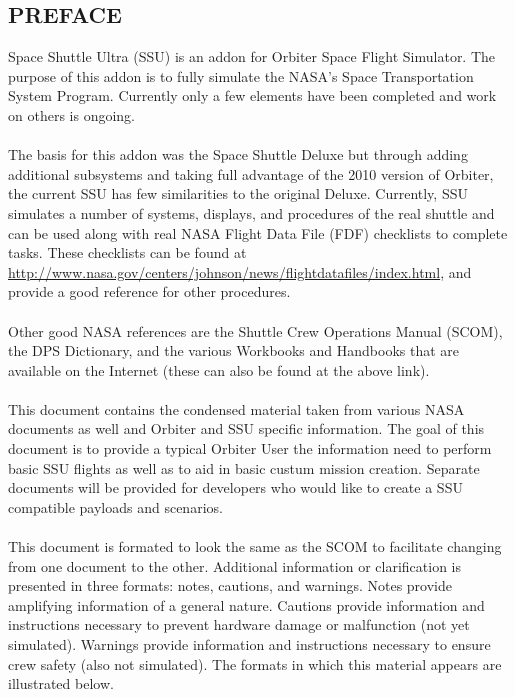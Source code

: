 \documentclass[13pt]{article}
\begin{document}
\begin{multicols}{2}
\section*{\large PREFACE}
Space Shuttle Ultra (SSU) is an addon for Orbiter Space Flight Simulator.  The purpose of this addon is to fully simulate the NASA's Space Transportation System Program.  Currently only a few elements have been completed and work on others is ongoing.\\
\\
The basis for this addon was the Space Shuttle Deluxe but through adding additional subsystems and taking full advantage of the 2010 version of Orbiter, the current SSU has few similarities to the original Deluxe.  Currently, SSU simulates a number of systems, displays, and procedures of the real shuttle and can be used along with real NASA Flight Data File (FDF) checklists to complete tasks.  These checklists can be found at \url{http://www.nasa.gov/centers/johnson/news/flightdatafiles/index.html}, and provide a good reference for other procedures.\\
\\
Other good NASA references are the Shuttle Crew Operations Manual (SCOM), the DPS Dictionary, and the various Workbooks and Handbooks that are available on the Internet (these can also be found at the above link). \\
\\
This document contains the condensed material taken from various NASA documents as well and Orbiter and SSU specific information.  The goal of this document is to provide a typical Orbiter User the information need to perform basic SSU flights as well as  to aid in basic custum mission creation.  Separate documents will be provided for developers who would like to create a SSU compatible payloads and scenarios.\\
\\
This document is formated to look the same as the SCOM to facilitate changing from one document to the other.  Additional information or clarification is presented in three formats: notes, cautions, and warnings. Notes provide amplifying information of a general nature. Cautions provide information and instructions necessary to prevent hardware damage or malfunction (not yet simulated). Warnings provide information and instructions necessary to ensure crew safety (also not simulated). The formats in which this material appears are illustrated below.\\

\end{multicols}
\end{document}
